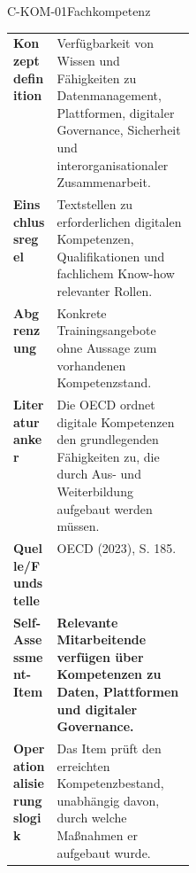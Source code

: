 \documentclass[10pt,a4paper]{article}
\begin{document}
\begin{codecard}{C-KOM-01}{Fachkompetenz}
\begin{tabularx}{\linewidth}{@{}>{\RaggedRight\arraybackslash\bfseries\color{DeepNavy}}p{0.245\linewidth}>{\RaggedRight\arraybackslash}X@{}}
Konzeptdefinition & Verfügbarkeit von Wissen und Fähigkeiten zu Datenmanagement, Plattformen, digitaler Governance, Sicherheit und interorganisationaler Zusammenarbeit. \\
\arrayrulecolor{SoftRule}\hline
Einschlussregel & Textstellen zu erforderlichen digitalen Kompetenzen, Qualifikationen und fachlichem Know-how relevanter Rollen. \\
\arrayrulecolor{SoftRule}\hline
Abgrenzung & Konkrete Trainingsangebote ohne Aussage zum vorhandenen Kompetenzstand. \\
\arrayrulecolor{SoftRule}\hline
Literaturanker & Die OECD ordnet digitale Kompetenzen den grundlegenden Fähigkeiten zu, die durch Aus- und Weiterbildung aufgebaut werden müssen. \\
\arrayrulecolor{SoftRule}\hline
Quelle/Fundstelle & OECD (2023), S. 185. \\
\arrayrulecolor{SoftRule}\hline
Self-Assessment-Item & \textbf{Relevante Mitarbeitende verfügen über Kompetenzen zu Daten, Plattformen und digitaler Governance.} \\
\arrayrulecolor{SoftRule}\hline
Operationalisierungslogik & Das Item prüft den erreichten Kompetenzbestand, unabhängig davon, durch welche Maßnahmen er aufgebaut wurde. \\
\end{tabularx}
\end{codecard}
\end{document}

